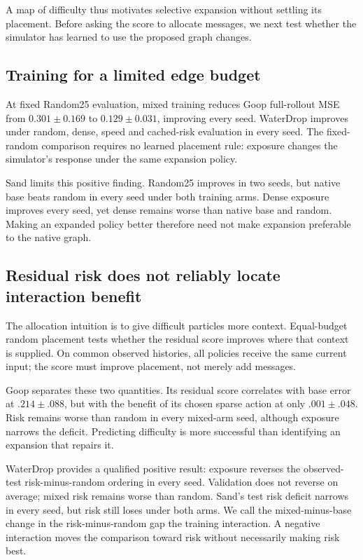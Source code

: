
A map of difficulty thus motivates selective expansion without settling its placement. Before asking the score to allocate messages, we next test whether the simulator has learned to use the proposed graph changes.

\subsection{Training for a limited edge budget}
At fixed Random25 evaluation, mixed training reduces Goop full-rollout MSE from $0.301\pm0.169$ to $0.129\pm0.031$, improving every seed. WaterDrop improves under random, dense, speed and cached-risk evaluation in every seed. The fixed-random comparison requires no learned placement rule: exposure changes the simulator's response under the same expansion policy.

Sand limits this positive finding. Random25 improves in two seeds, but native base beats random in every seed under both training arms. Dense exposure improves every seed, yet dense remains worse than native base and random. Making an expanded policy better therefore need not make expansion preferable to the native graph.


\subsection{Residual risk does not reliably locate interaction benefit}
The allocation intuition is to give difficult particles more context. Equal-budget random placement tests whether the residual score improves where that context is supplied. On common observed histories, all policies receive the same current input; the score must improve placement, not merely add messages.

Goop separates these two quantities. Its residual score correlates with base error at $.214\pm.088$, but with the benefit of its chosen sparse action at only $.001\pm.048$. Risk remains worse than random in every mixed-arm seed, although exposure narrows the deficit. Predicting difficulty is more successful than identifying an expansion that repairs it.

WaterDrop provides a qualified positive result: exposure reverses the observed-test risk-minus-random ordering in every seed. Validation does not reverse on average; mixed risk remains worse than random. Sand's test risk deficit narrows in every seed, but risk still loses under both arms. We call the mixed-minus-base change in the risk-minus-random gap the training interaction. A negative interaction moves the comparison toward risk without necessarily making risk best.

